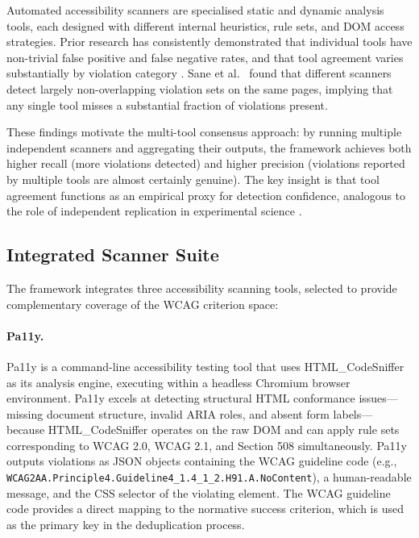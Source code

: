 Automated accessibility scanners are specialised static and dynamic analysis
tools, each designed with different internal heuristics, rule sets, and DOM
access strategies.  Prior research has consistently demonstrated that
individual tools have non-trivial false positive and false negative rates, and
that tool agreement varies substantially by violation category \cite{vigo2013}.
Sane et al.\ \cite{sane2023} found that different scanners detect largely
non-overlapping violation sets on the same pages, implying that any single
tool misses a substantial fraction of violations present.

These findings motivate the multi-tool consensus approach: by running multiple
independent scanners and aggregating their outputs, the framework achieves
both higher recall (more violations detected) and higher precision (violations
reported by multiple tools are almost certainly genuine).  The key insight
is that tool agreement functions as an empirical proxy for detection
confidence, analogous to the role of independent replication in experimental
science \cite{cohen1988}.

\subsection{Integrated Scanner Suite}

The framework integrates three accessibility scanning tools, selected to
provide complementary coverage of the WCAG criterion space:

\paragraph{Pa11y.}
Pa11y \cite{pa11y} is a command-line accessibility testing tool that uses
HTML\_CodeSniffer as its analysis engine, executing within a headless Chromium
browser environment.  Pa11y excels at detecting structural HTML conformance
issues—missing document structure, invalid ARIA roles, and absent form labels—
because HTML\_CodeSniffer operates on the raw DOM and can apply rule sets
corresponding to WCAG 2.0, WCAG 2.1, and Section 508 simultaneously.  Pa11y
outputs violations as JSON objects containing the WCAG guideline code (e.g.,
\texttt{WCAG2AA.Principle4.Guideline4\_1.4\_1\_2.H91.A.NoContent}), a
human-readable message, and the CSS selector of the violating element.  The
WCAG guideline code provides a direct mapping to the normative success
criterion, which is used as the primary key in the deduplication process.

